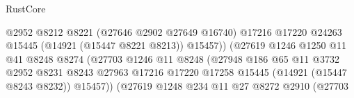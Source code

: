 \begin{lexlean}{RustCore}
\begin{coremodule}
                                                    @2952
                                                    @8212
                                                    @8221
                                                    (@27646 @2902 @27649 @16740)
                                                    @17216
                                                    @17220
                                                    @24263
                                                    @15445
                                                    (@14921 (@15447 @8221 @8213))
                                                    @15457))
                                                (@27619
                                                  @1246
                                                  @1250
                                                  @11
                                                  @41
                                                  @8248
                                                  @8274
                                                  (@27703
                                                    @1246
                                                    @11
                                                    @8248
                                                    (@27948
                                                      @186
                                                      @65
                                                      @11
                                                      @3732
                                                      @2952
                                                      @8231
                                                      @8243
                                                      @27963
                                                      @17216
                                                      @17220
                                                      @17258
                                                      @15445
                                                      (@14921 (@15447 @8243 @8232))
                                                      @15457))
                                                  (@27619
                                                    @1248
                                                    @234
                                                    @11
                                                    @27
                                                    @8272
                                                    @2910
                                                    (@27703

\end{coremodule}
\end{lexlean}
